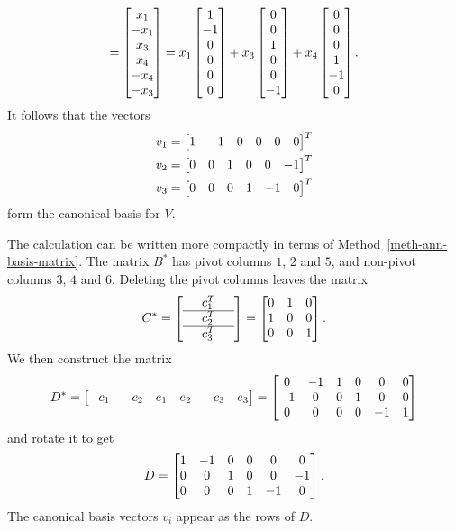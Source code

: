 \documentclass[a4paper]{amsart}
\renewenvironment{solution}{\SolutionInline}{\endSolutionInline}
\begin{document}
\begin{solution}
\[      = \left[\begin{matrix} x_1\\ -x_1 \\ x_3 \\ x_4 \\ -x_4 \\ -x_3 \end{matrix}\right]
      = x_1 \left[\begin{matrix} 1 \\ -1 \\ 0 \\ 0 \\  0 \\  0 \end{matrix}\right] + 
        x_3 \left[\begin{matrix} 0 \\  0 \\ 1 \\ 0 \\  0 \\ -1 \end{matrix}\right] + 
        x_4 \left[\begin{matrix} 0 \\  0 \\ 0 \\ 1 \\ -1 \\  0 \end{matrix}\right]. 
 \]
 It follows that the vectors 
 \begin{align*}
  v_1 &= \left[\begin{matrix} 1 & -1 & 0 & 0 &  0 &  0 \end{matrix}\right]^T \\
  v_2 &= \left[\begin{matrix} 0 &  0 & 1 & 0 &  0 & -1 \end{matrix}\right]^T \\
  v_3 &= \left[\begin{matrix} 0 &  0 & 0 & 1 & -1 &  0 \end{matrix}\right]^T 
 \end{align*}
 form the canonical basis for $V$.

 The calculation can be written more compactly in terms of
 Method~\ref{meth-ann-basis-matrix}.  The matrix $B^*$ has pivot 
 columns $1$, $2$ and $5$, and non-pivot columns $3$, $4$ and $6$.
 Deleting the pivot columns leaves the matrix
 \[ C^* =
    \left[\begin{array}{ccc}
     & c_1^T & \\ \hline
     & c_2^T & \\ \hline
     & c_3^T & 
    \end{array}\right]
    =
    \left[\begin{matrix} 0&1&0 \\ 1&0&0 \\ 0&0&1 \end{matrix}\right].
 \]
 We then construct the matrix
 \[ D^* = \left[\begin{matrix} -c_1 & -c_2 & e_1 & e_2 & -c_3 & e_3 \end{matrix}\right] 
     = \left[\begin{matrix} 
         0 & -1 &  1 &  0 &  0 &  0 \\
        -1 &  0 &  0 &  1 &  0 &  0 \\
         0 &  0 &  0 &  0 & -1 &  1
       \end{matrix}\right] 
 \]
 and rotate it to get 
 \[ D = 
     \left[\begin{matrix}
      1 & -1 & 0 & 0 & 0 & 0 \\
      0 & 0 & 1 & 0 & 0 & -1 \\
      0 & 0 & 0 & 1 & -1 & 0
     \end{matrix}\right].
 \]
 The canonical basis vectors $v_i$ appear as the rows of $D$.
\end{solution}
\end{document}
